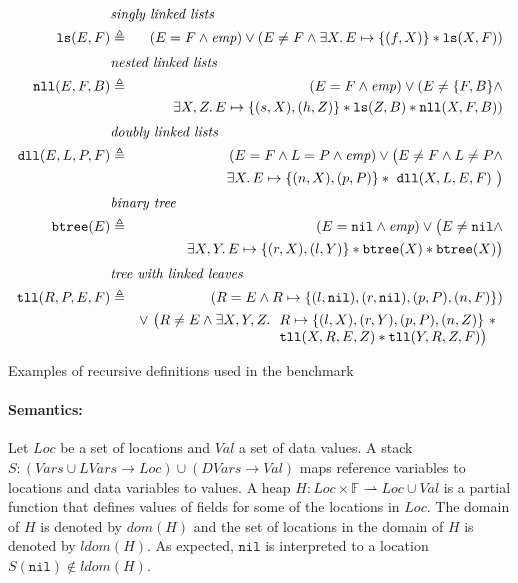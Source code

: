\documentclass{llncs}
\newcommand{\sep}{.\,}
\newcommand{\posep}{*}
\newcommand{\points}{\mapsto}
\newcommand{\vars}{\mathit{Vars}}
\newcommand{\lvars}{\mathit{LVars}}
\newcommand{\dvars}{\mathit{DVars}}
\newcommand{\pfields}{\mathbb{F}}
\newcommand{\loc}{\mathit{Loc}}
\newcommand{\vals}{\mathit{Val}}
\newcommand{\nil}{\mathtt{nil}}
\newcommand{\ls}{\mathtt{ls}}
\newcommand{\dll}{\mathtt{dll}}
\newcommand{\nll}{\mathtt{nll}}
\begin{document}
\begin{table}
\begin{eqnarray}
%
\lefteqn{\textit{singly linked lists}} \nonumber \\
\ls(E,F) & \triangleq & (E=F\land\mathit{emp}) \lor (E\neq F \land 
\exists X\sep E\points\{(f,X)\}\posep \ls(X,F)) 
\\[1mm]
%  
\lefteqn{\textit{nested linked lists}} \nonumber \\ 
\nll(E,F,B) & \triangleq & (E=F\land\mathit{emp}) \lor (E\neq \{F,B\} \land \\
&& \exists X,Z\sep E\points\{(s,X),(h,Z)\}\posep \ls(Z,B) \posep\nll(X,F,B)) \nonumber
\\[1mm]
%  
\lefteqn{\textit{doubly linked lists}} \nonumber \\ 
\dll(E, L, P, F) & \triangleq & (E=F\land L=P\land \mathit{emp}) \lor \big( E\neq F \land L\neq P \land \\
&& \exists X\sep E\points \{(n,X),(p,P)\} \posep\ \dll(X,L,E,F)\ \big)\nonumber
\\[1mm]
%  
\lefteqn{\textit{binary tree}} \nonumber \\ 
\mathtt{btree}(E) & \triangleq & (E=\nil\land \mathit{emp}) \lor \big( E\neq \nil \land 
\\
&& \exists X,Y\sep E\points \{(r,X),(l,Y)\} \posep \mathtt{btree}(X) \posep \mathtt{btree}(X)\big)
\nonumber 
\\[1mm]
%  
\lefteqn{\textit{tree with linked leaves}} \nonumber \\ 
\mathtt{tll}(R,P,E,F) & \triangleq & (R=E \land R\points \{(l,\nil),(r,\nil),(p,P),(n,F)\}) \\
&& \lor~\big( R\neq E \land \exists X,Y,Z\sep 
\begin{array}[t]{l}
R\points \{(l,X),(r,Y),(p,P),(n,Z)\} \ \posep \\
\mathtt{tll}(X,R,E,Z) \posep \mathtt{tll}(Y,R,Z,F)\big)
\end{array} \nonumber  
\end{eqnarray}

\caption{Examples of recursive definitions used in the benchmark}
\label{tab:RD}

\end{table}

\paragraph{Semantics:}
Let $\loc$ be a set of locations and $\vals$ a set of data values.
A stack $S : (\vars\cup\lvars\rightarrow \loc) \cup (\dvars\rightarrow\vals)$ maps
reference variables to locations and data variables to values. 
A heap $H:\loc\times\pfields\rightharpoonup\loc\cup\vals$ is a partial
function that defines values of fields for some of the locations in $\loc$.
%
The domain of $H$ is denoted by $\mathit{dom}(H)$ and
the set of locations in the domain of $H$ is denoted by $\mathit{ldom}(H)$.  
As expected, $\nil$ is interpreted to a location $S(\nil)\not\in \mathit{ldom}(H)$.
\end{document}
